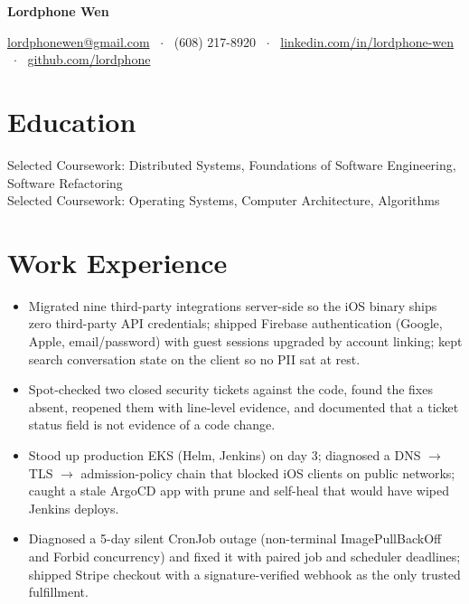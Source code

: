 \documentclass[11pt, letterpaper]{article}
\begin{document}
\noindent
{\LARGE\bfseries Lordphone Wen}%
\hfill
{}\\[5pt]
{\centering
  \href{mailto:lordphonewen@gmail.com}{lordphonewen@gmail.com} \ $\cdot$ \
  (608) 217-8920 \ $\cdot$ \
  \href{https://www.linkedin.com/in/lordphone-wen}{linkedin.com/in/lordphone-wen} \ $\cdot$ \
  \href{https://github.com/lordphone}{github.com/lordphone}\par
}

\section{Education}
Selected Coursework: Distributed Systems, Foundations of Software Engineering, Software Refactoring\\[1pt]
Selected Coursework: Operating Systems, Computer Architecture, Algorithms

\section{Work Experience}
\begin{itemize}
  \item Migrated nine third-party integrations server-side so the iOS binary ships zero third-party API credentials; shipped Firebase authentication (Google, Apple, email/password) with guest sessions upgraded by account linking; kept search conversation state on the client so no PII sat at rest.
  \item Spot-checked two closed security tickets against the code, found the fixes absent, reopened them with line-level evidence, and documented that a ticket status field is not evidence of a code change.
  \item Stood up production EKS (Helm, Jenkins) on day 3; diagnosed a DNS $\rightarrow$ TLS $\rightarrow$ admission-policy chain that blocked iOS clients on public networks; caught a stale ArgoCD app with prune and self-heal that would have wiped Jenkins deploys.
  \item Diagnosed a 5-day silent CronJob outage (non-terminal ImagePullBackOff and Forbid concurrency) and fixed it with paired job and scheduler deadlines; shipped Stripe checkout with a signature-verified webhook as the only trusted fulfillment.
\end{itemize}
\end{document}
